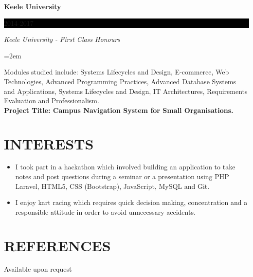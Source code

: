 \documentclass[paper=a4,fontsize=11pt]{scrartcl} %
\newcommand{\sepspace}{\vspace*{1em}}       %
\newcommand{\NewPart}[1]{\section*{\uppercase{#1}}}
\newcommand{\EducationEntry}[4]{
        \noindent \textbf{#1} \hfill      %
        \colorbox{Black}{%
            \parbox{6em}{%
            \hfill\color{White}#2}} \par  %
        \noindent \textit{#3} \par        %
        \noindent\hangindent=2em\hangafter=0 \small #4 %
        \normalsize \par}
\begin{document}
\EducationEntry{Keele University}{2014-2017}{Keele University - First Class Honours}{}{\noindent\small Modules studied include: Systems Lifecycles and Design, E-commerce, Web Technologies, Advanced Programming Practices, Advanced Database Systems and Applications, Systems Lifecycles and Design, IT Architectures, Requirements Evaluation and Professionalism. \\
 \textbf{\footnotesize Project Title: Campus Navigation System for Small Organisations.}

\sepspace


\NewPart{Interests}{}
 \begin{itemize}
\item I took part in a hackathon which involved building an application to take notes
and post questions during a seminar or a presentation using PHP Laravel, HTML5,
CSS (Bootstrap), JavaScript, MySQL and Git.
\item I enjoy kart racing which requires quick decision making, concentration and a
responsible attitude in order to avoid unnecessary accidents.
\end{itemize}}
\NewPart{References}{}
Available upon request
\end{document}
